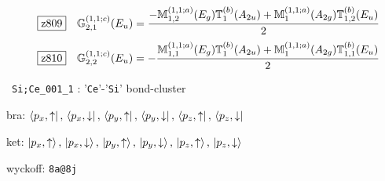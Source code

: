 \documentclass[fleqn,10pt,landscape]{jsarticle}
\begin{document}
\begin{dmath*}
\hspace*{3mm}\fbox{z809}\quad \mathbb{G}_{2,1}^{(1,1;c)}(E_{u})=\frac{- \mathbb{M}_{1,2}^{(1,1;a)}(E_{g}) \mathbb{T}_{1}^{(b)}(A_{2u}) + \mathbb{M}_{1}^{(1,1;a)}(A_{2g}) \mathbb{T}_{1,2}^{(b)}(E_{u})}{2}
\end{dmath*}
\begin{dmath*}
\hspace*{3mm}\fbox{z810}\quad \mathbb{G}_{2,2}^{(1,1;c)}(E_{u})=- \frac{\mathbb{M}_{1,1}^{(1,1;a)}(E_{g}) \mathbb{T}_{1}^{(b)}(A_{2u}) + \mathbb{M}_{1}^{(1,1;a)}(A_{2g}) \mathbb{T}_{1,1}^{(b)}(E_{u})}{2}
\end{dmath*}
\vspace{5mm}

\noindent\textbullet\, \texttt{Si;Ce_001_1} : '\texttt{Ce}'-'\texttt{Si}' bond-cluster

\noindent\quad * bra: $\bra{p_{x},\uparrow},\, \bra{p_{x},\downarrow},\, \bra{p_{y},\uparrow},\, \bra{p_{y},\downarrow},\, \bra{p_{z},\uparrow},\, \bra{p_{z},\downarrow}$

\noindent\quad * ket: $\ket{p_{x},\uparrow},\, \ket{p_{x},\downarrow},\, \ket{p_{y},\uparrow},\, \ket{p_{y},\downarrow},\, \ket{p_{z},\uparrow},\, \ket{p_{z},\downarrow}$

\noindent\quad * wyckoff: \texttt{8a@8j}
\end{document}
